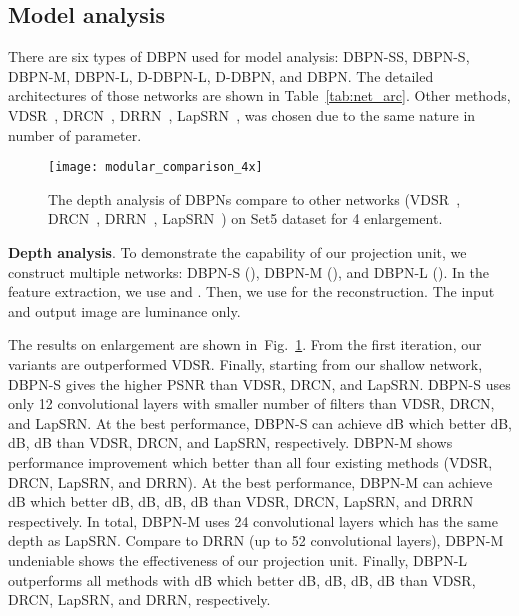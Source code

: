 \documentclass[10pt,journal,compsoc]{IEEEtran}
\begin{document}
\subsection{Model analysis}
There are six types of DBPN used for model analysis: DBPN-SS, DBPN-S, DBPN-M, DBPN-L, D-DBPN-L, D-DBPN, and DBPN.
The detailed architectures of those networks are shown in Table~\ref{tab:net_arc}.
Other methods, VDSR~\cite{Kim_2016_VDSR}, DRCN~\cite{kim2016deeply}, DRRN~\cite{Tai-DRRN-2017}, LapSRN~\cite{LapSRN}, was chosen due to the same nature in number of parameter.

\label{subsec:modelanalysis}
\begin{figure}[t!]
\centering
\texttt{[image: modular\_comparison\_4x]}\vspace{-1.5em}
\caption{The depth analysis of DBPNs compare to other networks (VDSR~\cite{Kim_2016_VDSR}, DRCN~\cite{kim2016deeply}, DRRN~\cite{Tai-DRRN-2017}, LapSRN~\cite{LapSRN}) on Set5 dataset for 4 enlargement.}
\label{figure:modular_comparison_4x}
\end{figure} 

\noindent \textbf{Depth analysis}. To demonstrate the capability of our projection unit, we construct multiple networks: DBPN-S (), DBPN-M (), and DBPN-L (). In the feature extraction, we use  and . Then, we use  for the reconstruction. The input and output image are luminance only. 

The results on  enlargement are shown in~Fig.~\ref{figure:modular_comparison_4x}. 
From the first  iteration, our variants are outperformed VDSR.
Finally, starting from our shallow network, DBPN-S gives the higher PSNR than VDSR, DRCN, and LapSRN. 
DBPN-S uses only 12 convolutional layers with smaller number of filters than VDSR, DRCN, and LapSRN. At the best performance, DBPN-S can achieve  dB which better  dB,  dB,  dB than VDSR, DRCN, and LapSRN, respectively. DBPN-M shows performance improvement which better than all four existing methods (VDSR, DRCN, LapSRN, and DRRN). At the best performance, DBPN-M can achieve  dB which better  dB,  dB,  dB,  dB than VDSR, DRCN, LapSRN, and DRRN respectively. In total, DBPN-M uses 24 convolutional layers which has the same depth as LapSRN. Compare to DRRN (up to 52 convolutional layers), DBPN-M undeniable shows the effectiveness of our projection unit. Finally, DBPN-L outperforms all methods with  dB which better  dB,  dB,  dB,  dB than VDSR, DRCN, LapSRN, and DRRN, respectively.
\end{document}

